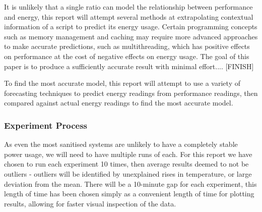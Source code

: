 It is unlikely that a single ratio can model the relationship between performance and energy, this report will attempt
several methods at extrapolating contextual information of a script to predict its energy usage.
Certain programming concepts such as memory management and caching may require more advanced approaches to make accurate
predictions, such as multithreading, which has positive effects on performance at the cost of negative effects on energy
usage\cite{MultithreadingEnergy}.
The goal of this paper is to produce a sufficiently accurate result with minimal effort.... [FINISH]

To find the most accurate model, this report will attempt to use a variety of forecasting techniques to predict energy
readings from performance readings, then compared against actual energy readings to find the most accurate model.

\subsubsection{Experiment Process}
As even the most sanitised systems are unlikely to have a completely stable power usage, we will need to have multiple
runs of each.
For this report we have chosen to run each experiment 10 times, then average results deemed to not be outliers -
outliers will be identified by unexplained rises in temperature, or large deviation from the mean.
There will be a 10-minute gap for each experiment, this length of time has been chosen simply as a convenient length of
time for plotting results, allowing for faster visual inspection of the data.
